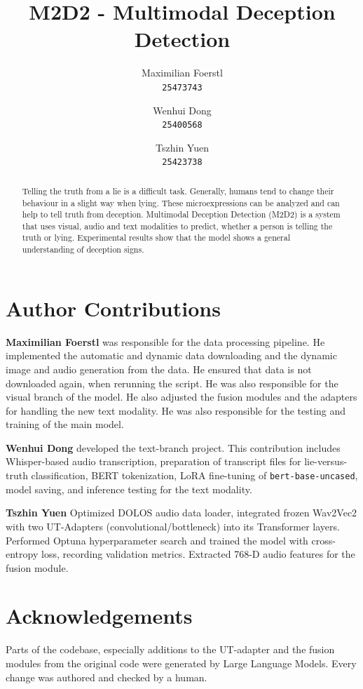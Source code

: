 \documentclass[10pt,twocolumn,letterpaper]{article}
\title{M2D2 - Multimodal Deception Detection}
\author{Maximilian Foerstl\\
{\tt\small 25473743}
\and
Wenhui Dong\\
{\tt\small 25400568}
\and
Tszhin Yuen\\
{\tt\small 25423738}
}
\begin{document}
\maketitle

\begin{abstract}
Telling the truth from a lie is a difficult task. Generally, humans tend to change their behaviour in a slight way when lying. These microexpressions can be 
analyzed and can help to tell truth from deception. 
Multimodal Deception Detection (M2D2) is a system that uses visual, audio and text modalities to predict, whether a person is telling the truth or lying. 
Experimental results show that the model shows a general understanding of deception signs.
\end{abstract}








% 
% 

\section*{Author Contributions}
\textbf{Maximilian Foerstl} was responsible for the data processing pipeline. He implemented the automatic and dynamic
data downloading and the dynamic image and audio generation from the data. He ensured that data is not downloaded again, 
when rerunning the script. He was also responsible for the visual branch of the model. He also adjusted the fusion modules and
the adapters for handling the new text modality. He was also responsible for the testing and training of the main model. 

\textbf{Wenhui Dong} developed the text-branch project. This contribution includes Whisper-based audio transcription, preparation of transcript files for lie-versus-truth classification, BERT tokenization, LoRA fine-tuning of \texttt{bert-base-uncased}, model saving, and inference testing for the text modality.

\textbf{Tszhin Yuen} Optimized DOLOS audio data loader, integrated frozen Wav2Vec2 with two UT-Adapters (convolutional/bottleneck) into its Transformer layers. Performed Optuna hyperparameter search and trained the model with cross-entropy loss, recording validation metrics. Extracted 768-D audio features for the fusion module.

\section*{Acknowledgements}
Parts of the codebase, especially additions to the UT-adapter and the fusion modules from the original 
code were generated by Large Language Models. Every change was authored and checked by a human.

{
    \small
    
    
}

% 
\end{document}
